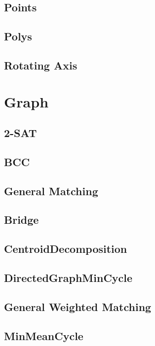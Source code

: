 \subsection{Points}

\subsection{Polys}

\subsection{Rotating Axis}




\section{Graph}
\subsection{2-SAT}

\subsection{BCC}

\subsection{General Matching}

\subsection{Bridge}

\subsection{CentroidDecomposition}

\subsection{DirectedGraphMinCycle}

\subsection{General Weighted Matching}

\subsection{MinMeanCycle}

